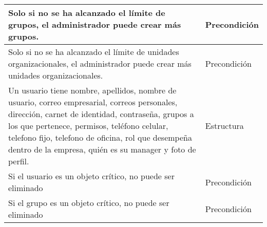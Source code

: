 \begin{longtable}{|p{10cm}|l|}
    Solo si no se ha alcanzado el límite de grupos, el administrador puede crear más grupos.                                                                                                                                                                                                                             & Precondición    \\ \hline
    Solo si no se ha alcanzado el límite de unidades organizacionales, el administrador puede crear más unidades organizacionales.                                                                                                                                                                                       & Precondición    \\ \hline
    Un usuario tiene nombre, apellidos, nombre de usuario, correo empresarial, correos personales, dirección, carnet de identidad, contraseña, grupos a los que pertenece, permisos, teléfono celular, telefono fijo, telefono de oficina, rol que desempeña dentro de la empresa, quién es su manager y foto de perfil. & Estructura      \\ \hline
    Si el usuario es un objeto crítico, no puede ser eliminado                                                                                                                                                                                                                                                           & Precondición    \\ \hline
    Si el grupo es un objeto crítico, no puede ser eliminado                                                                                                                                                                                                                                                             & Precondición    \\\hline
\end{longtable}
